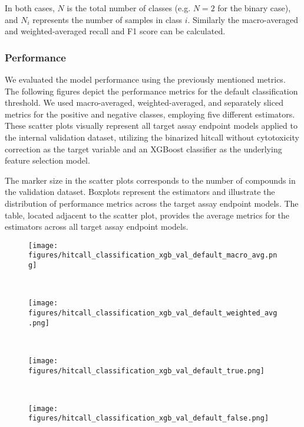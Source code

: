 In both cases, $N$ is the total number of classes (e.g. $N=2$ for the binary case), and $N_i$ represents the number of samples in class $i$. Similarly the macro-averaged and weighted-averaged recall and F1 score can be calculated.

\subsubsection{Performance}
We evaluated the model performance using the previously mentioned metrics. The following figures depict the performance metrics for the default classification threshold. We used macro-averaged, weighted-averaged, and separately sliced metrics for the positive and negative classes, employing five different estimators. These scatter plots visually represent all target assay endpoint models applied to the internal validation dataset, utilizing the binarized hitcall without cytotoxicity correction as the target variable and an XGBoost classifier as the underlying feature selection model.

The marker size in the scatter plots corresponds to the number of compounds in the validation dataset. Boxplots represent the estimators and illustrate the distribution of performance metrics across the target assay endpoint models. The table, located adjacent to the scatter plot, provides the average metrics for the estimators across all target assay endpoint models.

\begin{figure}[h]
  \centering
  \texttt{[image: figures/hitcall\_classification\_xgb\_val\_default\_macro\_avg.png]}
  \caption{}
~\label{fig:hitcall_classification_xgb_val_default_weighted_avg}
\end{figure}

\begin{figure}[h]
  \centering
  \texttt{[image: figures/hitcall\_classification\_xgb\_val\_default\_weighted\_avg.png]}
  \caption{}
~\label{fig:hitcall_classification_xgb_val_default_weighted_avg}
\end{figure}

\begin{figure}[h]
  \centering
  \texttt{[image: figures/hitcall\_classification\_xgb\_val\_default\_true.png]}
  \caption{}
~\label{fig:hitcall_classification_xgb_val_default_true}
\end{figure}

\begin{figure}[h]
  \centering
  \texttt{[image: figures/hitcall\_classification\_xgb\_val\_default\_false.png]}
  \caption{}
~\label{fig:hitcall_classification_xgb_val_default_false}
\end{figure}



